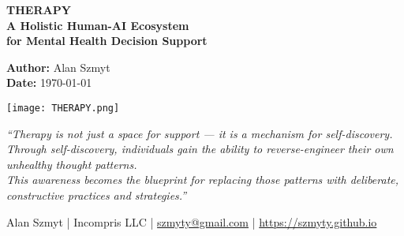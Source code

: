 \begin{titlepage}
\centering

\begin{framed}
\vspace{0.5cm}

{\LARGE\bfseries THERAPY}\\[0.6em]
{\large\bfseries A Holistic Human-AI Ecosystem}\\[0.25em]
{\large\bfseries for Mental Health Decision Support}

\vspace{1.2cm}

{\normalsize
\textbf{Author:} Alan Szmyt \\
\textbf{Date:} \today
}

\vspace{1.5cm}

\texttt{[image: THERAPY.png]}

\vspace{1.5cm}

\begin{minipage}{0.9\textwidth}
\centering
\itshape
“Therapy is not just a space for support — it is a mechanism for self-discovery.\\
Through self-discovery, individuals gain the ability to reverse-engineer their own unhealthy thought patterns.\\
This awareness becomes the blueprint for replacing those patterns with deliberate, constructive practices and strategies.”
\end{minipage}

\vspace{1cm}
\end{framed}

\vspace{0.5cm}

\begin{center}
\footnotesize
Alan Szmyt \quad | \quad Incompris LLC \quad | \quad \href{mailto:szmyty@gmail.com}{szmyty@gmail.com} \quad | \quad \url{https://szmyty.github.io}
\end{center}

\end{titlepage}
